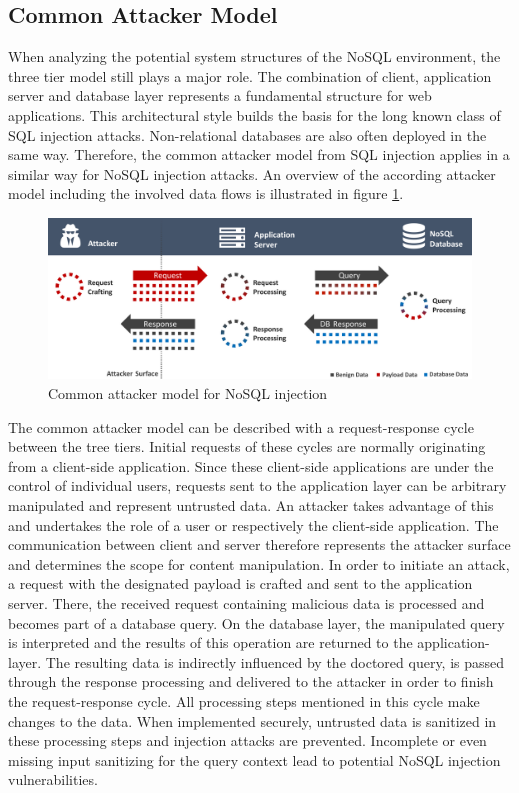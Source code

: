 \subsection{Common Attacker Model}
\label{sec:commonAttackerModel}

When analyzing the potential system structures of the NoSQL environment, the three tier model still plays a major role. The combination of client, application server and database layer represents a fundamental structure for web applications. This architectural style builds the basis for the long known class of SQL injection attacks. Non-relational databases are also often deployed in the same way. Therefore, the common attacker model from SQL injection applies in a similar way for NoSQL injection attacks. An overview of the according attacker model including the involved data flows is illustrated in figure \ref{fig:normalAttackerModel}.

\begin{figure}[h]
\centering
  \includegraphics[width=1\linewidth]{Images/attacker_model_normal}
  \caption{Common attacker model for NoSQL injection}
  \label{fig:normalAttackerModel}
\end{figure}

The common attacker model can be described with a request-response cycle between the tree tiers. Initial requests of these cycles are normally originating from a client-side application. Since these client-side applications are under the control of individual users, requests sent to the application layer can be arbitrary manipulated and represent untrusted data. An attacker takes advantage of this and undertakes the role of a user or respectively the client-side application. The communication between client and server therefore represents the attacker surface and determines the scope for content manipulation. In order to initiate an attack, a request with the designated payload is crafted and sent to the application server. There, the received request containing malicious data is processed and becomes part of a database query. On the database layer, the manipulated query is interpreted and the results of this operation are returned to the application-layer. The resulting data is indirectly influenced by the doctored query, is passed through the response processing and delivered to the attacker in order to finish the request-response cycle. All processing steps mentioned in this cycle make changes to the data. When implemented securely, untrusted data is sanitized in these processing steps and injection attacks are prevented. Incomplete or even missing input sanitizing for the query context lead to potential NoSQL injection vulnerabilities.\\

